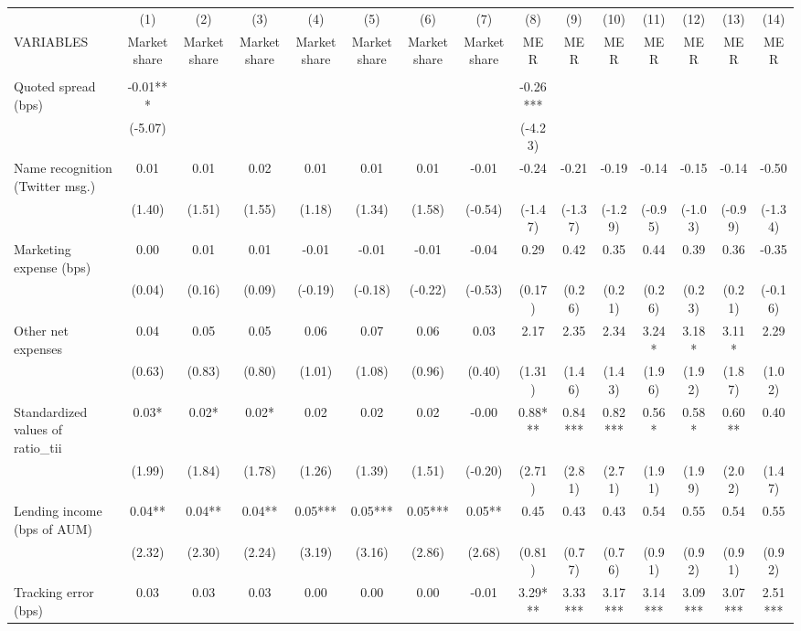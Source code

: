 \documentclass[]{article}
\begin{document}
\begin{tabular}{lcccccccccccccc} \hline
 & (1) & (2) & (3) & (4) & (5) & (6) & (7) & (8) & (9) & (10) & (11) & (12) & (13) & (14) \\
VARIABLES & Market share & Market share & Market share & Market share & Market share & Market share & Market share & MER & MER & MER & MER & MER & MER & MER \\ \hline
 &  &  &  &  &  &  &  &  &  &  &  &  &  &  \\
Quoted spread (bps) & -0.01*** &  &  &  &  &  &  & -0.26*** &  &  &  &  &  &  \\
 & (-5.07) &  &  &  &  &  &  & (-4.23) &  &  &  &  &  &  \\
Name recognition (Twitter msg.) & 0.01 & 0.01 & 0.02 & 0.01 & 0.01 & 0.01 & -0.01 & -0.24 & -0.21 & -0.19 & -0.14 & -0.15 & -0.14 & -0.50 \\
 & (1.40) & (1.51) & (1.55) & (1.18) & (1.34) & (1.58) & (-0.54) & (-1.47) & (-1.37) & (-1.29) & (-0.95) & (-1.03) & (-0.99) & (-1.34) \\
Marketing expense (bps) & 0.00 & 0.01 & 0.01 & -0.01 & -0.01 & -0.01 & -0.04 & 0.29 & 0.42 & 0.35 & 0.44 & 0.39 & 0.36 & -0.35 \\
 & (0.04) & (0.16) & (0.09) & (-0.19) & (-0.18) & (-0.22) & (-0.53) & (0.17) & (0.26) & (0.21) & (0.26) & (0.23) & (0.21) & (-0.16) \\
Other net expenses & 0.04 & 0.05 & 0.05 & 0.06 & 0.07 & 0.06 & 0.03 & 2.17 & 2.35 & 2.34 & 3.24* & 3.18* & 3.11* & 2.29 \\
 & (0.63) & (0.83) & (0.80) & (1.01) & (1.08) & (0.96) & (0.40) & (1.31) & (1.46) & (1.43) & (1.96) & (1.92) & (1.87) & (1.02) \\
Standardized values of ratio\_tii & 0.03* & 0.02* & 0.02* & 0.02 & 0.02 & 0.02 & -0.00 & 0.88*** & 0.84*** & 0.82*** & 0.56* & 0.58* & 0.60** & 0.40 \\
 & (1.99) & (1.84) & (1.78) & (1.26) & (1.39) & (1.51) & (-0.20) & (2.71) & (2.81) & (2.71) & (1.91) & (1.99) & (2.02) & (1.47) \\
Lending income (bps of AUM) & 0.04** & 0.04** & 0.04** & 0.05*** & 0.05*** & 0.05*** & 0.05** & 0.45 & 0.43 & 0.43 & 0.54 & 0.55 & 0.54 & 0.55 \\
 & (2.32) & (2.30) & (2.24) & (3.19) & (3.16) & (2.86) & (2.68) & (0.81) & (0.77) & (0.76) & (0.91) & (0.92) & (0.91) & (0.92) \\
Tracking error (bps) & 0.03 & 0.03 & 0.03 & 0.00 & 0.00 & 0.00 & -0.01 & 3.29*** & 3.33*** & 3.17*** & 3.14*** & 3.09*** & 3.07*** & 2.51*** \\

\end{tabular}
\end{document}
